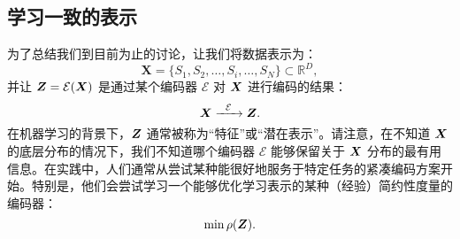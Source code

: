 \documentclass[../../book-main_zh.tex]{subfiles}
\begin{document}







\subsection{学习一致的表示}

\label{sec:consistency}
为了总结我们到目前为止的讨论，让我们将数据表示为：
\begin{equation}
    \boldsymbol{X} = \{S_1, S_2, \ldots, S_i, \ldots, S_N\} \subset \mathbb{R}^D,
\end{equation}
并让 $\boldsymbol{Z} = \mathcal{E}(\bm{X})$ 是通过某个编码器 $\mathcal{E}$ 对 $\bm{X}$ 进行编码的结果：
\begin{equation}
    \bm{X}  \xrightarrow{\hspace{2mm} \mathcal{E}\hspace{2mm}} \bm{Z}.
    \label{eqn:open-loop}
\end{equation}
在机器学习的背景下，$\bm{Z}$ 通常被称为“特征”或“潜在表示”。请注意，在不知道 $\bm{X}$ 的底层分布的情况下，我们不知道哪个编码器 $\mathcal{E}$ 能够保留关于 $\bm{X}$ 分布的最有用信息。在实践中，人们通常从尝试某种能很好地服务于特定任务的紧凑编码方案开始。特别是，他们会尝试学习一个能够优化学习表示的某种（经验）简约性度量的编码器：
\begin{equation}
    \min \rho(\bm{Z}). 
\end{equation}
\end{document}
